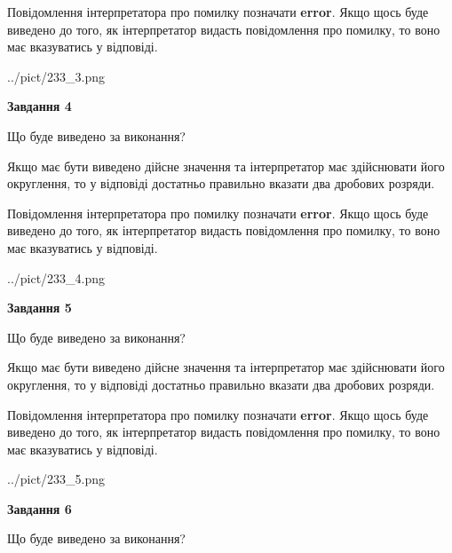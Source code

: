\documentclass[12pt, ukrainian]{article}
\begin{document}
{\begin {Large}
Повідомлення інтерпретатора про помилку позначати \textbf{error}.
Якщо щось буде виведено до того, як інтерпретатор видасть повідомлення про помилку, 
то воно має вказуватись у відповіді. \par

\begin{center}
	{../pict/233_3.png}
\end{center}
\newpage

{\begin {center}\textbf{Завдання 4}\end {center}}\par
Що буде виведено за виконання? \par

Якщо має бути виведено дійсне значення та інтерпретатор має здійснювати його округлення, 
то у відповіді достатньо правильно вказати два дробових розряди.

Повідомлення інтерпретатора про помилку позначати \textbf{error}.
Якщо щось буде виведено до того, як інтерпретатор видасть повідомлення про помилку, 
то воно має вказуватись у відповіді. \par

\begin{center}
	{../pict/233_4.png}
\end{center}
\newpage

{\begin {center}\textbf{Завдання 5}\end {center}}\par
Що буде виведено за виконання? \par

Якщо має бути виведено дійсне значення та інтерпретатор має здійснювати його округлення, 
то у відповіді достатньо правильно вказати два дробових розряди.

Повідомлення інтерпретатора про помилку позначати \textbf{error}.
Якщо щось буде виведено до того, як інтерпретатор видасть повідомлення про помилку, 
то воно має вказуватись у відповіді. \par

\begin{center}
	{../pict/233_5.png}
\end{center}
\newpage

{\begin {center}\textbf{Завдання 6}\end {center}}\par
Що буде виведено за виконання? \par


\end{Large}}
\end{document}
